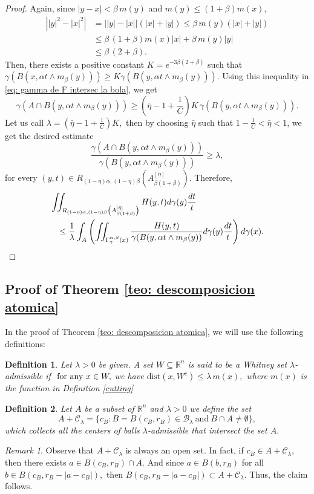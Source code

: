 \documentclass[leqno,11pt]{amsart}
\theoremstyle{plain}
\newtheorem{defi}{Definition}
\theoremstyle{remark}
\newtheorem{remark}{Remark}
\begin{document}
{{{\begin{proof}
Again, since $|y-x|<\beta\, m(y)$ and $ m(y)\leq (1+\beta) m(x)$,
\begin{align*}
    \left||y|^2-|x|^2\right|&=\left||y|-|x|\right|\left(|x|+|y|\right)\leq \beta\, m(y)(|x|+|y|) \\
    & \leq \beta \, (1+\beta) m(x)|x|+ \beta \, m(y)|y|\\
    &\leq \beta\, (2+\beta).
\end{align*}
Then, there exists a positive constant $K=e^{-3\beta(2+\beta)}$ such that $\gamma(B(x,\alpha t\wedge m_\beta(y)))\geq K \gamma(B(y,\alpha t\wedge m_\beta(y)))$. Using this inequality in \eqref{eq: gamma de F intersec la bola}, we get 
\[\gamma(A\cap B(y,\alpha t\wedge m_\beta(y)))\geq \left(\bar{\eta}-1+\frac{1}{C}\right)K\, \gamma(B(y,\alpha t\wedge m_\beta(y))). \] Let us call $\lambda=\left(\bar{\eta}-1+\frac{1}{C}\right)K,$ then 
by choosing $\bar{\eta}$ such that $1-\frac{1}{C}<\bar{\eta} <1$, we get the desired estimate
\[\frac{\gamma(A\cap B(y,\alpha t\wedge m_\beta(y)))}{\gamma(B(y,\alpha t\wedge m_\beta(y)))}\geq \lambda,\]
for every $(y,t)\in R_{(1-\eta)\alpha, (1-\eta)\beta}\left(A^{[\bar{\eta}]}_{\beta(1+\beta)}\right)$. Therefore, 
\begin{align*} &\iint_{R_{(1-\eta)\alpha, (1-\eta)\beta}\left(A^{[\bar{\eta}]}_{\beta(1+\beta)}\right)} H(y,t) d\gamma(y) \frac{dt}{t}    \\
& \;\;\; \leq \frac{1}{\lambda} \int_A \left(\iint_{\Gamma_\gamma^{\alpha, \beta}(x)} \frac{H(y,t)}{\gamma(B(y,\alpha t\wedge m_\beta(y))} d\gamma(y) \frac{dt}{t}\right) d\gamma(x).\qedhere
\end{align*}
\end{proof}


 
\subsection{Proof of Theorem \ref{teo: descomposicion atomica} }\label{elteorema}

In the proof of Theorem \ref{teo: descomposicion atomica}, we will use the following definitions:
\begin{defi}
Let $\lambda>0$ be given. A set $W\subseteq \mathbb{R}^n$ is said to be a Whitney set $\lambda$-admissible if $\hbox{ for any } x\in W,$ we have $\text{dist}(x,W^c)\le \lambda\, m(x),$ where $m(x)$ is the function in Definition \ref{cutting}
\end{defi}
\begin{defi}
Let $A$ be a subset of $\mathbb{R}^n$ and $\lambda>0$ we define the set 
$$A+\mathscr{C}_\lambda=\{c_B: B=B(c_B,r_B)\in \mathscr{B}_\lambda\ \text{and}\ B\cap A\ne \emptyset \},$$ which collects all the centers of balls $\lambda$-admissible that intersect the set $A.$ 
\end{defi}
 \begin{remark}
Observe that $A+\mathscr{C}_\lambda$ is always an open set. In fact, if $c_B\in A+\mathscr{C}_\lambda,$ then there exists $a\in B(c_B, r_B)\cap A.$ And since $a\in B(b,r_B)$ for all $b\in B(c_B, r_B-|a-c_B|),$ then $B(c_B, r_B-|a-c_B|)\subset A+\mathscr{C}_\lambda.$ Thus, the claim follows.
 \end{remark}

}}}
\end{document}
